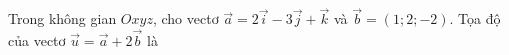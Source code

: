 \begin{ex}
Trong không gian $Oxyz$, cho vectơ $\vec{a}=2\vec{i}-3\vec{j}+\vec{k}$ và $\vec{b}=(1;2;-2)$. Tọa độ của vectơ $\vec{u}=\vec{a}+2\vec{b}$ là
\end{ex}
